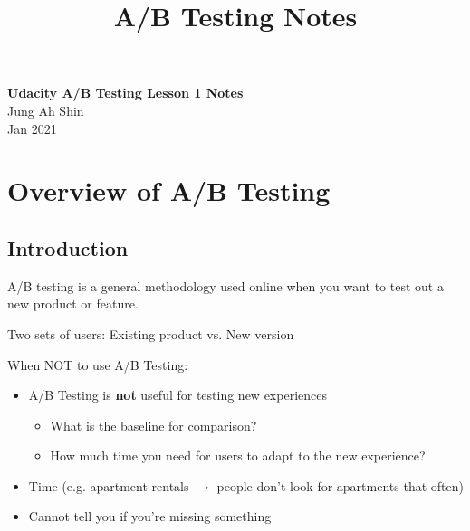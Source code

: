 \documentclass[10pt]{article}
\theoremstyle{definition}
\begin{document}
\setcounter{section}{0}
\title{A/B Testing Notes}

\thispagestyle{empty}

\begin{center}
{\LARGE \bf Udacity A/B Testing Lesson 1 Notes}\\
{\large Jung Ah Shin}\\
Jan 2021
\end{center}
\section{Overview of A/B Testing}
\subsection{Introduction}
A/B testing is a general methodology used online when you want to test out a new product or feature.

Two sets of users: Existing product vs. New version 

When NOT to use A/B Testing:
\begin{itemize}
\item A/B Testing is \textbf{not} useful for testing new experiences
\begin{itemize}
\item What is the baseline for comparison?
\item How much time you need for users to adapt to the new experience?
\end{itemize}
\item Time (e.g. apartment rentals $\rightarrow$ people don't look for apartments that often) 
\item Cannot tell you if you're missing something
\end{itemize}
\end{document}
